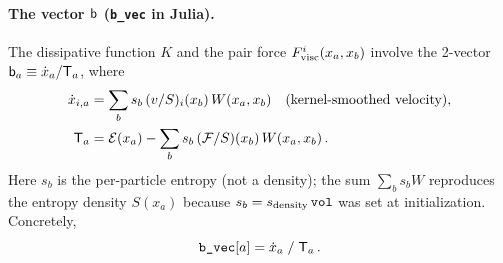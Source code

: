 \documentclass[12pt,aps,preprint,nofootinbib,noshowkeys,noshowpacs,longbibliography,superscriptaddress,tightenlines]{revtex4-2}
\def\bbeta{{\sf b}}
\def\Teff{{\sf T}}
\def\F{{\mathcal F}}
\def\E{{\mathcal E}}
\begin{document}
\paragraph{The vector $\bbeta$ (\texttt{b\_vec} in Julia).}
The dissipative function $K$ and the pair force $F^i_{\rm visc}(x_a,x_b)$ involve
the 2-vector $\bbeta_a \equiv \dot x_a / \Teff_a$, where
\begin{align}
    \dot x_{i,a} &= \sum_b s_b\,(v/S)_i(x_b)\,W(x_a, x_b)
    \quad\text{(kernel-smoothed velocity)}, \label{eq:dotx}\\
    \Teff_a      &= \E(x_a) - \sum_b s_b\,({\F}/S)(x_b)\,W(x_a, x_b) \,. \label{eq:Teff}
\end{align}
Here $s_b$ is the per-particle entropy (not a density); the sum $\sum_b s_b W$
reproduces the entropy density $S(x_a)$ because $s_b = s_{\rm density}\,\texttt{vol}$
was set at initialization.
Concretely,
\begin{equation}
    \texttt{b\_vec}[a] = \dot x_a \;/\; \Teff_a \,.
\end{equation}
\end{document}
